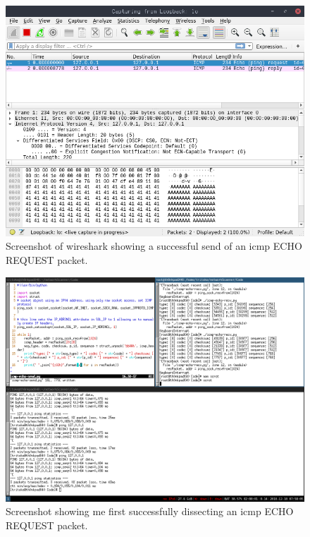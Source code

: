 \documentclass[titlepage]{article}
\begin{document}
\begin{figure}[H]
  \centering
  \includegraphics[width=\textwidth]{screenshots/ping_send_success.png}
  \caption{%
    Screenshot of wireshark showing a successful send of an \gls{icmp} ECHO REQUEST packet.
  }\label{pingsuccess}
\end{figure}

\begin{figure}[H]
  \centering
  \includegraphics[width=\textwidth]{screenshots/local_self_ping.png}
  \caption{%
    Screenshot showing me first successfully dissecting an \gls{icmp} ECHO REQUEST packet.
  }\label{dissectsuccess}
\end{figure}
\end{document}

